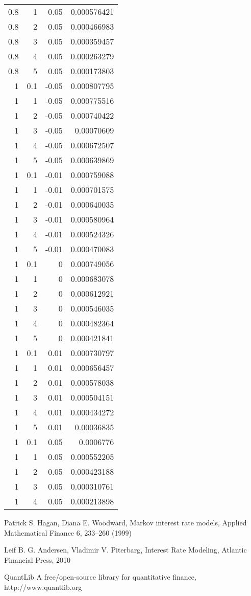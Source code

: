 \documentclass{amsart}
\theoremstyle{plain}
\numberwithin{equation}{section}
\begin{document}
\begin{longtable}{r | r | r | r}
0.8 & 1 & 0.05 & 0.000576421 \\ 
0.8 & 2 & 0.05 & 0.000466983 \\ 
0.8 & 3 & 0.05 & 0.000359457 \\ 
0.8 & 4 & 0.05 & 0.000263279 \\ 
0.8 & 5 & 0.05 & 0.000173803 \\ \hline
1 & 0.1 & -0.05 & 0.000807795 \\ 
1 & 1 & -0.05 & 0.000775516 \\ 
1 & 2 & -0.05 & 0.000740422 \\ 
1 & 3 & -0.05 & 0.00070609 \\ 
1 & 4 & -0.05 & 0.000672507 \\ 
1 & 5 & -0.05 & 0.000639869 \\ \hline
1 & 0.1 & -0.01 & 0.000759088 \\ 
1 & 1 & -0.01 & 0.000701575 \\ 
1 & 2 & -0.01 & 0.000640035 \\ 
1 & 3 & -0.01 & 0.000580964 \\ 
1 & 4 & -0.01 & 0.000524326 \\ 
1 & 5 & -0.01 & 0.000470083 \\ \hline
1 & 0.1 & 0 & 0.000749056 \\ 
1 & 1 & 0 & 0.000683078 \\ 
1 & 2 & 0 & 0.000612921 \\ 
1 & 3 & 0 & 0.000546035 \\ 
1 & 4 & 0 & 0.000482364 \\ 
1 & 5 & 0 & 0.000421841 \\ \hline
1 & 0.1 & 0.01 & 0.000730797 \\ 
1 & 1 & 0.01 & 0.000656457 \\ 
1 & 2 & 0.01 & 0.000578038 \\ 
1 & 3 & 0.01 & 0.000504151 \\ 
1 & 4 & 0.01 & 0.000434272 \\ 
1 & 5 & 0.01 & 0.00036835 \\ \hline
1 & 0.1 & 0.05 & 0.0006776 \\ 
1 & 1 & 0.05 & 0.000552205 \\ 
1 & 2 & 0.05 & 0.000423188 \\ 
1 & 3 & 0.05 & 0.000310761 \\ 
1 & 4 & 0.05 & 0.000213898
\label{zerofloor}
\end{longtable}


\begin{thebibliography}{2}

 Patrick S. Hagan, Diana E. Woodward, Markov interest rate models, Applied Mathematical Finance 6, 233–260 (1999)

Leif B. G. Andersen, Vladimir V. Piterbarg, Interest Rate Modeling, Atlantic Financial Press, 2010

QuantLib A free/open-source library for quantitative finance, http://www.quantlib.org

\end{thebibliography}
\end{document}
